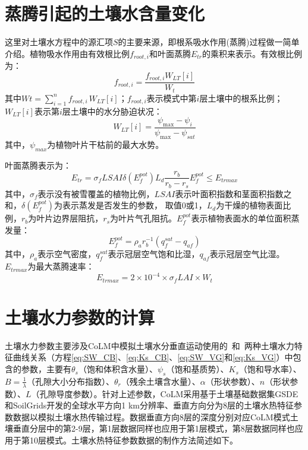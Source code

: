 \section{蒸腾引起的土壤水含量变化}

这里对土壤水方程中的源汇项$S$的主要来源，即根系吸水作用(蒸腾)过程做一简单介绍。植物吸水作用由有效根比例$f_{root,i}$和叶面蒸腾$E_{tr}$的乘积来表示\citep{dai2003common}。有效根比例为：
\begin{equation}
{f}_{ {root }, {i}}=\frac{{f}_{{root}, {i}} {W}_{{LT}}[{i}]}{W_{t}}
\end{equation}
其中$Wt = \sum_{i=1}^{n}{f_{root,i\ }W_{LT}\left[i\right]}$；$f_{root,i}$表示模式中第$i$层土壤中的根系比例；$W_{LT}[i]$表示第$i$层土壤中的水分胁迫状况：
\begin{equation}
{W}_{{LT}}[{i}]=\frac{\psi_{\max }-\psi_{i}}{\psi_{\max }-\psi_{sat}}
\end{equation}
其中，$\psi_{max}$为植物叶片干枯前的最大水势。

叶面蒸腾表示为：
\begin{equation}
{E}_{{tr}}=\sigma_{{f}} LSAI \delta\left({E}_{{f}}^{{pot}}\right) {L}_{{d}} \frac{{r}_{{b}}}{{r}_{{b}}-{r}_{{s}}} {E}_{{f}}^{{pot}} \leqslant {E}_{{trmax}}
\end{equation}
其中，$\sigma_f$表示没有被雪覆盖的植物比例，$LSAI$表示叶面积指数和茎面积指数之和，$\delta\left(E_f^{pot}\right)$为表示蒸发是否发生的参数，
取值0或1，$L_d$为干燥的植物表面比例，$r_b$为叶片边界层阻抗，$r_s$为叶片气孔阻抗。$E_f^{pot}$表示植物表面水的单位面积蒸发量：
\begin{equation}
{E}_{{f}}^{{pot}}=\rho_{{a}} {r}_{{b}}^{-1}\left({q}_{{f}}^{{sat}}-{q}_{{af}}\right)
\end{equation}
其中，$\rho_a$表示空气密度，$q_f^{sat}$表示冠层空气饱和比湿，$q_{af}$表示冠层空气比湿。$E_{trmax}$为最大蒸腾速率：
\begin{equation}
{E}_{ {trmax }}=2 \times 10^{-4} \times \sigma_{{f}} L A I \times W_{t}
\end{equation}

\section{土壤水力参数的计算}\label{sec_hydropar}
土壤水力参数主要涉及CoLM中模拟土壤水分垂直运动使用的~\citet{campbell1974}和~\citet{van1980closed}两种土壤水力特征曲线关系（方程\eqref{eq:SW_CB}、\eqref{eq:Ks_CB}、\eqref{eq:SW_VG}和\eqref{eq:Ks_VG}）中包含的参数，主要有$\theta_s$（饱和体积含水量）、$\psi_s$（饱和基质势）、$K_s$（饱和导水率）、$B=\frac{1}{\lambda}$（孔隙大小分布指数）、$\theta_r$（残余土壤含水量）、$\alpha$（形状参数）、$n$（形状参数）、$L$（孔隙导度参数）。针对上述参数，CoLM采用基于土壤基础数据集GSDE和SoilGrids开发的全球水平方向1 km分辨率、垂直方向分为8层的土壤水热特征参数数据以模拟土壤水热传输过程。数据垂直方向8层的深度分别对应CoLM模式土壤垂直分层中的第2-9层，第1层数据同样也应用于第1层模式，第8层数据同样也应用于第10层模式。土壤水热特征参数数据的制作方法简述如下。


